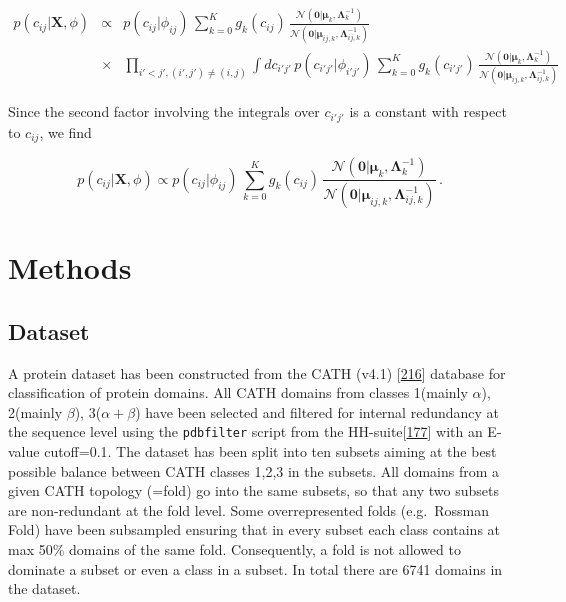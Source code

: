\documentclass[11pt,a4paper,twoside]{book}
\newcommand{\Gauss}{\mathcal{N}}
\newcommand{\Lijk}{\mathbf{\Lambda}_{ij,k}}
\newcommand{\Lk}{\mathbf{\Lambda}_k}
\newcommand{\muijk}{\mathbf{\mu}_{ij,k}}
\newcommand{\muk}{\mathbf{\mu}_k}
\newcommand{\cij}{c_{ij}}
\newcommand{\X}{\mathbf{X}}
\theoremstyle{definition}
\theoremstyle{definition}
\theoremstyle{remark}
\begin{document}
\begin{eqnarray}
    p(\cij | \X, \phi) & \propto & 
            p(\cij |\phi_{ij}) \, \sum_{k=0}^K g_{k}(\cij) \, \frac{\Gauss( \mathbf{0} | \muk, \Lk^{-1})}{\Gauss(\mathbf{0} | \muijk, \Lijk^{-1})} \nonumber\\
            & \times  & \prod_{i'<j', (i',j') \ne (i,j)} \int d c_{i'j'} \, p(c_{i'j'} |\phi_{i'j'}) \, \sum_{k=0}^K g_{k}(c_{i'j'}) \, \frac{\Gauss( \mathbf{0} | \muk, \Lk^{-1})}{\Gauss(\mathbf{0} | \muijk, \Lijk^{-1})}
\end{eqnarray}

Since the second factor involving the integrals over \(c_{i'j'}\) is a
constant with respect to \(\cij\), we find

\begin{equation}
    p(\cij | \X, \phi) \propto  p(\cij |\phi_{ij}) \,  \sum_{k=0}^K g_{k}(\cij) \, \frac{\Gauss( \mathbf{0} | \muk, \Lk^{-1})}{\Gauss(\mathbf{0} | \muijk, \Lijk^{-1})}  \, .
\label{eq:posterior-marginal-rij}
\end{equation}

\chapter{Methods}\label{methods}

\section{Dataset}\label{dataset}

A protein dataset has been constructed from the CATH (v4.1)
{[}\protect\hyperlink{ref-Sillitoe2015}{216}{]} database for
classification of protein domains. All CATH domains from classes
1(mainly \(\alpha\)), 2(mainly \(\beta\)), 3(\(\alpha+\beta\)) have been
selected and filtered for internal redundancy at the sequence level
using the \texttt{pdbfilter} script from the
HH-suite{[}\protect\hyperlink{ref-Remmert2012}{177}{]} with an E-value
cutoff=0.1. The dataset has been split into ten subsets aiming at the
best possible balance between CATH classes 1,2,3 in the subsets. All
domains from a given CATH topology (=fold) go into the same subsets, so
that any two subsets are non-redundant at the fold level. Some
overrepresented folds (e.g.~Rossman Fold) have been subsampled ensuring
that in every subset each class contains at max 50\% domains of the same
fold. Consequently, a fold is not allowed to dominate a subset or even a
class in a subset. In total there are 6741 domains in the dataset.
\end{document}
